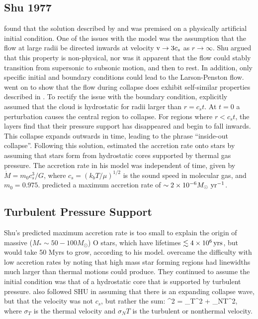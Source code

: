 \documentclass[../dissertation.tex]{subfiles}
\begin{document}
\subsection{Shu 1977} \label{subsec:Shu_review}
\citet{1977ApJ...214..488S} found that the solution described by \citet{1969MNRAS.145..271L} and \citet{1969MNRAS.144..425P} was premised on a physically artificial initial condition.
One of the issues with the model was the assumption that the flow at large radii be directed inwards at velocity ${\rm v} \rightarrow 3c_s$ as $r \rightarrow \infty$. 
Shu argued that this property is non-physical, nor was it apparent that the flow could stably transition from supersonic to subsonic motion, and then to rest. 
In addition, only specific initial and boundary conditions could lead to the Larson-Penston flow.
\citet{1977ApJ...214..488S} went on to show that the flow during collapse does exhibit self-similar properties described in \citet{1969MNRAS.145..271L}.
To rectify the issue with the boundary condition, \citet{1977ApJ...214..488S} explicitly assumed that the cloud is hydrostatic for radii larger than $r = c_s t$. 
At $t=0$ a perturbation causes the central region to collapse. 
For regions where $r < c_s t$, the layers find that their pressure support has disappeared and begin to fall inwards. 
This collapse expands outwards in time, leading to the phrase ``inside-out collapse''. 
Following this solution, \citet{1977ApJ...214..488S} estimated the accretion rate onto 
stars by assuming that stars form from hydrostatic cores supported by thermal gas pressure. 
The accretion rate in his model was independent of time, given by $\dot{M} = m_0c_s^3/G$, where $c_s = (k_b T / \mu)^{1/2}$  is the sound
speed in molecular gas, and $m_0 = 0.975$. 
\citet{1977ApJ...214..488S} predicted a maximum accretion rate of $\sim 2\times10^{-6} M_\odot\,\,\rm yr^{-1}$.

\subsection{Turbulent Pressure Support}
Shu's predicted maximum  accretion rate is too small to explain the origin of massive ($M_*\sim50-100M_\odot$) O stars, which have lifetimes $\lesssim 4\times10^6\,\rm yrs$, but would take 50 Myrs to grow, according to his model.
\citet{1992ApJ...396..631M}  overcame the difficulty with low accretion rates by noting that high mass star forming regions had linewidths much larger than thermal motions could produce. 
They continued to assume the initial condition was that of a hydrostatic core that is supported by turbulent pressure. 
\citet{1992ApJ...396..631M} also followed SHU in assuming that there is an expanding collapse wave, but that the velocity was not $c_s$, but rather the sum: 
%
\be
\sigma^2 = \sigma_T^2 + \sigma_{NT}^2, 
\ee
%
where $\sigma_T$ is the thermal velocity and $\sigma_NT$ is the turbulent or nonthermal velocity. 
\end{document}
